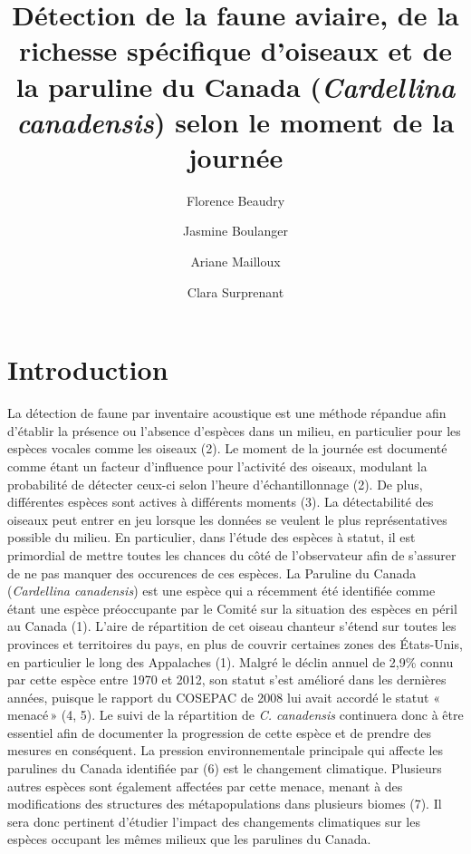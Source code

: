 \documentclass[9pt,twocolumn,twoside,]{pnas-new}
\title{Détection de la faune aviaire, de la richesse spécifique
d'oiseaux et de la paruline du Canada (\emph{Cardellina canadensis})
selon le moment de la journée}
\author[]{Florence Beaudry}
\author[]{Jasmine Boulanger}
\author[]{Ariane Mailloux}
\author[]{Clara Surprenant}
\affil[1]{Université de Sherbrooke, 2500 Boulevard de l'Université,
Sherbrooke, Québec, Canada}
\begin{document}
\verticaladjustment{-2pt}



\maketitle
\thispagestyle{firststyle}


\hypertarget{introduction}{%
\section*{Introduction}\label{introduction}}

La détection de faune par inventaire acoustique est une méthode répandue
afin d'établir la présence ou l'absence d'espèces dans un milieu, en
particulier pour les espèces vocales comme les oiseaux (2). Le moment de
la journée est documenté comme étant un facteur d'influence pour
l'activité des oiseaux, modulant la probabilité de détecter ceux-ci
selon l'heure d'échantillonnage (2). De plus, différentes espèces sont
actives à différents moments (3). La détectabilité des oiseaux peut
entrer en jeu lorsque les données se veulent le plus représentatives
possible du milieu. En particulier, dans l'étude des espèces à statut,
il est primordial de mettre toutes les chances du côté de l'observateur
afin de s'assurer de ne pas manquer des occurences de ces espèces. La
Paruline du Canada (\emph{Cardellina canadensis}) est une espèce qui a
récemment été identifiée comme étant une espèce préoccupante par le
Comité sur la situation des espèces en péril au Canada (1). L'aire de
répartition de cet oiseau chanteur s'étend sur toutes les provinces et
territoires du pays, en plus de couvrir certaines zones des États-Unis,
en particulier le long des Appalaches (1). Malgré le déclin annuel de
2,9\% connu par cette espèce entre 1970 et 2012, son statut s'est
amélioré dans les dernières années, puisque le rapport du COSEPAC de
2008 lui avait accordé le statut «\,menacé\,» (4, 5). Le suivi de la
répartition de \emph{C. canadensis} continuera donc à être essentiel
afin de documenter la progression de cette espèce et de prendre des
mesures en conséquent. La pression environnementale principale qui
affecte les parulines du Canada identifiée par (6) est le changement
climatique. Plusieurs autres espèces sont également affectées par cette
menace, menant à des modifications des structures des métapopulations
dans plusieurs biomes (7). Il sera donc pertinent d'étudier l'impact des
changements climatiques sur les espèces occupant les mêmes milieux que
les parulines du Canada.
\end{document}
